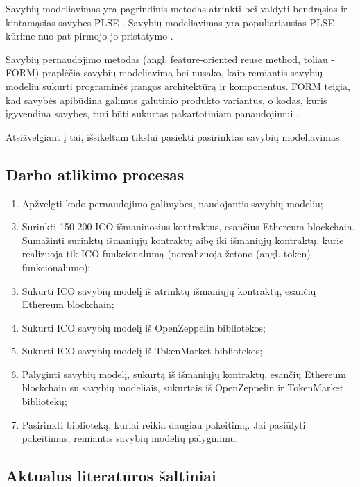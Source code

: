 \documentclass{VUMIFPSbakalaurinis}
\begin{document}
Savybių modeliavimas yra pagrindinis metodas atrinkti bei valdyti bendrąsias ir kintamąsias savybes PLSE \cite{Czarnecki2004}. Savybių modeliavimas yra populiariausias PLSE kūrime nuo pat pirmojo jo pristatymo \cite{Kang1990}.

Savybių pernaudojimo metodas (angl. feature-oriented reuse method, toliau - FORM) praplėčia savybių modeliavimą bei nusako, kaip remiantis savybių modeliu sukurti programinės įrangos architektūrą ir komponentus. FORM teigia, kad savybės apibūdina galimus galutinio produkto variantus, o kodas, kuris įgyvendina savybes, turi būti sukurtas pakartotiniam panaudojimui \cite{Kang}.

Atsižvelgiant į tai, išsikeltam tikslui pasiekti pasirinktas savybių modeliavimas.



\subsection{Darbo atlikimo procesas}
\begin{enumerate}[topsep=0pt,itemsep=-1ex,partopsep=1ex,parsep=1ex]
\item Apžvelgti kodo pernaudojimo galimybes, naudojantis savybių modeliu;
\item Surinkti 150-200 ICO išmaniuosius kontraktus, esančius Ethereum blockchain. Sumažinti surinktų išmaniųjų kontraktų aibę iki išmaniųjų kontraktų, kurie realizuoja tik ICO funkcionalumą (nerealizuoja žetono (angl. token) funkcionalumo);
\item Sukurti ICO savybių modelį iš atrinktų išmaniųjų kontraktų, esančių Ethereum blockchain;
\item Sukurti ICO savybių modelį iš OpenZeppelin bibliotekos;
\item Sukurti ICO savybių modelį iš TokenMarket bibliotekos;
\item Palyginti savybių modelį, sukurtą iš išmaniųjų kontraktų, esančių Ethereum blockchain 
su savybių modeliais, sukurtais iš OpenZeppelin ir TokenMarket bibliotekų;
\item Pasirinkti biblioteką, kuriai reikia daugiau pakeitimų. Jai pasiūlyti pakeitimus, remiantis savybių modelių palyginimu.
\end{enumerate}

\subsection{Aktualūs literatūros šaltiniai}
\end{document}
